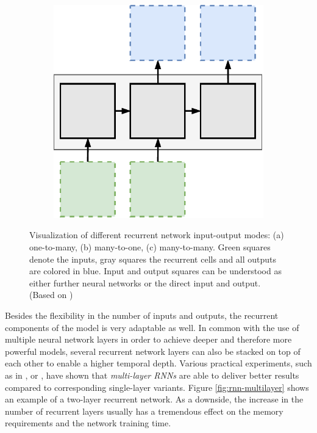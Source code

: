 \begin{figure}[htpb]
\begin{subfigure}{0.3\textwidth}
  \centering
  \includegraphics[width=.8\linewidth]{figures/many2many.pdf}
  \caption{}
  \label{fig:rnn-many2many}
\end{subfigure}
\caption[RNN Input-Output Modes]{Visualization of different recurrent network input-output modes: (a) one-to-many, (b) many-to-one, (c) many-to-many. Green squares denote the inputs, gray squares the recurrent cells and all outputs are colored in blue. Input and output squares can be understood as either further neural networks or the direct input and output. (Based on \parencite{rnn-effectiveness})}
\label{fig:rnn-modes}
\end{figure}

Besides the flexibility in the number of inputs and outputs, the recurrent components of the model is very adaptable as well. In common with the use of multiple neural network layers in order to achieve deeper and therefore more powerful models, several recurrent network layers can also be stacked on top of each other to enable a higher temporal depth. Various practical experiments, such as in \parencite{beyond_snippets_video_class}, \parencite{conv_lstm_nowcasting} or \parencite{unsup_learn_lstm}, have shown that \textit{multi-layer RNNs} are able to deliver better results compared to corresponding single-layer variants. Figure \ref{fig:rnn-multilayer} shows an example of a two-layer recurrent network. As a downside, the increase in the number of recurrent layers usually has a tremendous effect on the memory requirements and the network training time.


